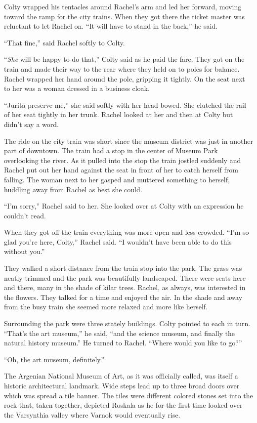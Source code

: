 Colty wrapped his tentacles around Rachel's arm and led her forward, moving toward the ramp for
the city trains. When they got there the ticket master was reluctant to let Rachel on. ``It will
have to stand in the back,'' he said.

``That fine,'' said Rachel softly to Colty.

``\emph{She} will be happy to do that,'' Colty said as he paid the fare. They got on the train
and made their way to the rear where they held on to poles for balance. Rachel wrapped her hand
around the pole, gripping it tightly. On the seat next to her was a woman dressed in a business
cloak.

``Jurita preserve me,'' she said softly with her head bowed. She clutched the rail of her seat
tightly in her trunk. Rachel looked at her and then at Colty but didn't say a word.

The ride on the city train was short since the museum district was just in another part of
downtown. The train had a stop in the center of Museum Park overlooking the river. As it pulled
into the stop the train jostled suddenly and Rachel put out her hand against the seat in front
of her to catch herself from falling. The woman next to her gasped and muttered something to
herself, huddling away from Rachel as best she could.

``I'm sorry,'' Rachel said to her. She looked over at Colty with an expression he couldn't read.

When they got off the train everything was more open and less crowded. ``I'm so glad you're
here, Colty,'' Rachel said. ``I wouldn't have been able to do this without you.''

They walked a short distance from the train stop into the park. The grass was neatly trimmed and
the park was beautifully landscaped. There were seats here and there, many in the shade of kilar
trees. Rachel, as always, was interested in the flowers. They talked for a time and enjoyed the
air. In the shade and away from the busy train she seemed more relaxed and more like herself.

Surrounding the park were three stately buildings. Colty pointed to each in turn. ``That's the
art museum,'' he said, ``and the science museum, and finally the natural history museum.'' He
turned to Rachel. ``Where would you like to go?''

``Oh, the art museum, definitely.''

The Argenian National Museum of Art, as it was officially called, was itself a historic
architectural landmark. Wide steps lead up to three broad doors over which was spread a tile
banner. The tiles were different colored stones set into the rock that, taken together, depicted
Roskala as he for the first time looked over the Varsynthia valley where Varnok would eventually
rise.

